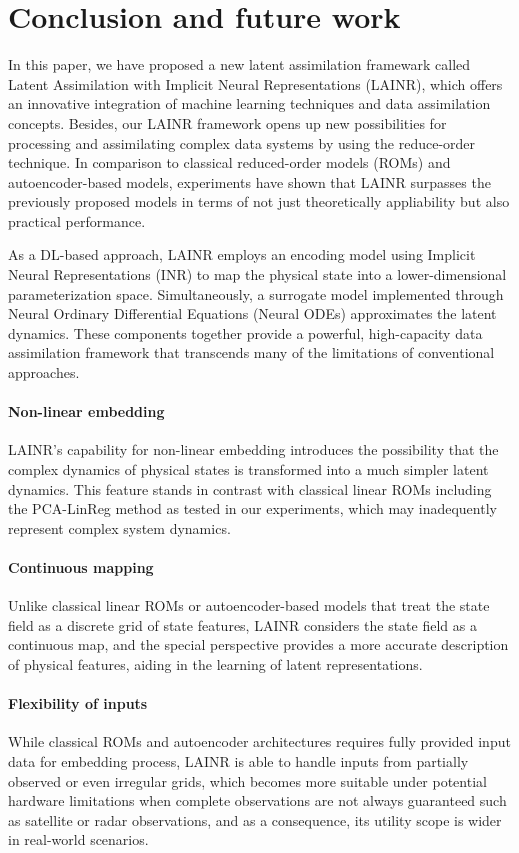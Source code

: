\documentclass{article}
\begin{document}
\section{Conclusion and future work}
In this paper, we have proposed a new latent assimilation framewark called Latent Assimilation with Implicit Neural Representations (LAINR), which offers an innovative integration of machine learning techniques and data assimilation concepts. Besides, our LAINR framework opens up new possibilities for processing and assimilating complex data systems by using the reduce-order technique. In comparison to classical reduced-order models (ROMs) and autoencoder-based models, experiments have shown that LAINR surpasses the previously proposed models in terms of not just theoretically appliability but also practical performance.

As a DL-based approach, LAINR employs an encoding model using Implicit Neural Representations (INR) to map the physical state into a lower-dimensional parameterization space. Simultaneously, a surrogate model implemented through Neural Ordinary Differential Equations (Neural ODEs) approximates the latent dynamics. These components together provide a powerful, high-capacity data assimilation framework that transcends many of the limitations of conventional approaches.
\paragraph{Non-linear embedding}
LAINR's capability for non-linear embedding introduces the possibility that the complex dynamics of physical states is transformed into a much simpler latent dynamics. This feature stands in contrast with classical linear ROMs including the PCA-LinReg method as tested in our experiments, which may inadequently represent complex system dynamics.
\paragraph{Continuous mapping}
Unlike classical linear ROMs or autoencoder-based models that treat the state field as a discrete grid of state features, LAINR considers the state field as a continuous map, and the special perspective provides a more accurate description of physical features, aiding in the learning of latent representations.
\paragraph{Flexibility of inputs}
While classical ROMs and autoencoder architectures requires fully provided input data for embedding process, LAINR is able to handle inputs from partially observed or even irregular grids, which becomes more suitable under potential hardware limitations when complete observations are not always guaranteed such as satellite or radar observations, and as a consequence, its utility scope is wider in real-world scenarios.
\end{document}

